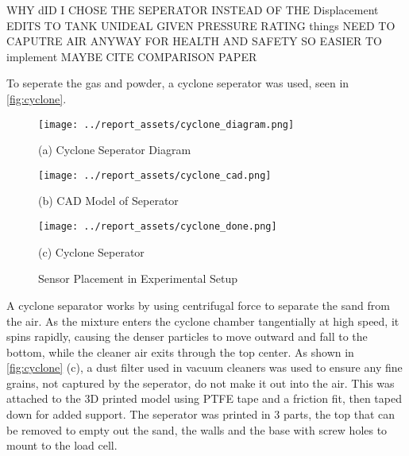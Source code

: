 WHY dID I CHOSE THE SEPERATOR INSTEAD OF THE Displacement
EDITS TO TANK UNIDEAL GIVEN PRESSURE RATING things
NEED TO CAPUTRE AIR ANYWAY FOR HEALTH AND SAFETY SO EASIER TO implement
MAYBE CITE COMPARISON PAPER

To seperate the gas and powder, a cyclone seperator was used, seen in \autoref{fig:cyclone}.
\begin{figure}[htbp]
    \centering

    \begin{minipage}{0.3\textwidth}
        \centering
        \texttt{[image: ../report\_assets/cyclone\_diagram.png]}
        \caption*{(a) Cyclone Seperator Diagram}
    \end{minipage}
    \hfill
    \begin{minipage}{0.3\textwidth}
        \centering
        \texttt{[image: ../report\_assets/cyclone\_cad.png]}
        \caption*{(b) CAD Model of Seperator}
    \end{minipage}
    \hfill
    \begin{minipage}{0.3\textwidth}
        \centering
        \texttt{[image: ../report\_assets/cyclone\_done.png]}
        \caption*{(c) Cyclone Seperator}
    \end{minipage}
    \caption{Sensor Placement in Experimental Setup}\label{fig:cyclone}
\end{figure}
A cyclone separator works by using centrifugal force to separate the sand from the air. As the mixture enters the cyclone chamber tangentially at high speed, it spins rapidly, causing the denser particles to move outward and fall to the bottom, while the cleaner air exits through the top center. As shown in \autoref{fig:cyclone} (c), a dust filter used in vacuum cleaners was used to ensure any fine grains, not captured by the seperator, do not make it out into the air. This was attached to the 3D printed model using PTFE tape and a friction fit, then taped down for added support. The seperator was printed in 3 parts, the top that can be removed to empty out the sand, the walls and the base with screw holes to mount to the load cell.

